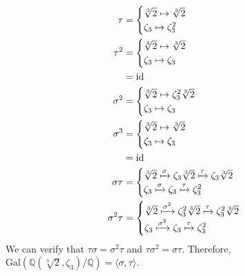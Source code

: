 \documentclass[10pt]{extarticle}
\newcommand{\Q}{\mathbb{Q}}
\begin{document}
\begin{enumerate}[(1)]
\begin{align*}
        \tau &= 
        \begin{cases}
          \sqrt[3]{2}\mapsto \sqrt[3]{2}\\
          \zeta_3 \mapsto \zeta_3^2
        \end{cases}\\
        \tau^2 &=
        \begin{cases}
          \sqrt[3]{2}\mapsto \sqrt[3]{2}\\
          \zeta_3 \mapsto \zeta_3
        \end{cases}\\
               &= \text{id}\\
        \sigma^2 &= \begin{cases}
          \sqrt[3]{2} \mapsto \zeta_3^2\sqrt[3]{2}\\
          \zeta_3 \mapsto \zeta_3
        \end{cases}\\
          \sigma^3 &= \begin{cases}
            \sqrt[3]{2} \mapsto \sqrt[3]{2}\\
            \zeta_3 \mapsto \zeta_3
          \end{cases}\\
                   &= \text{id}\\
      \sigma\tau &= \begin{cases}
        \sqrt[3]{2} \xmapsto{\sigma} \zeta_3\sqrt[3]{2}\xmapsto{\tau} \zeta_3\sqrt[3]{2}\\
        \zeta_3 \xmapsto{\sigma} \zeta_3\xmapsto{\tau} \zeta_3^2
      \end{cases}\\
        \sigma^2\tau &= \begin{cases}
          \sqrt[3]{2} \xmapsto{\sigma^2} \zeta_3^2\sqrt[3]{2}\xmapsto{\tau}\zeta_3^2\sqrt[3]{2}\\
          \zeta_3 \xmapsto{\sigma^2}\zeta_3\xmapsto{\tau} \zeta_3^2
        \end{cases}
      \end{align*}
      We can verify that $\tau\sigma = \sigma^2 \tau$ and $\tau\sigma^2 = \sigma\tau$. Therefore, $\text{Gal}(\Q(\sqrt[3]{2},\zeta_3)/\Q) = \langle \sigma,\tau\rangle$.\\


\end{enumerate}
\end{document}
